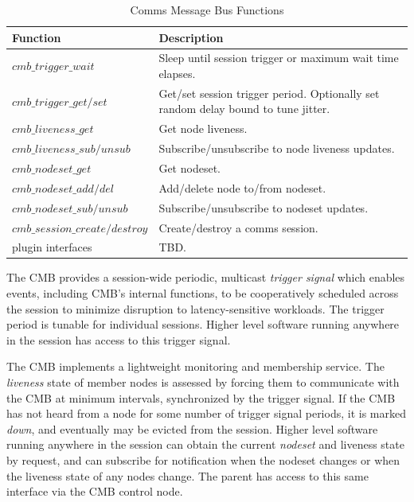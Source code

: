 \begin{table}
  \centering
  \begin{tabular}{| l | p{} |}\hline
  \textbf{Function} & \textbf{Description} \\
  \hline
  $cmb\_trigger\_wait $ &
	Sleep until session trigger or maximum wait time elapses. \\
  $cmb\_trigger\_get/set$ &
	Get/set session trigger period.
	Optionally set random delay bound to tune jitter.\\
  \hline
  $cmb\_liveness\_get$ &
	Get node liveness. \\
  $cmb\_liveness\_sub/unsub$ &
	Subscribe/unsubscribe to node liveness updates. \\
  \hline
  $cmb\_nodeset\_get$ &
	Get nodeset. \\
  $cmb\_nodeset\_add/del$ &
	Add/delete node to/from nodeset. \\
  $cmb\_nodeset\_sub/unsub$ &
	Subscribe/unsubscribe to nodeset updates. \\
  \hline
  $cmb\_session\_create/destroy$ &
	Create/destroy a comms session. \\
  \hline
  plugin interfaces &
	TBD. \\
  \hline
  \end{tabular}
  \caption{Comms Message Bus Functions}
  \label{TabCMBFun}
\end{table}
%

The CMB provides a session-wide periodic, multicast {\em trigger signal}
which enables events, including CMB's internal functions, to be cooperatively
scheduled across the session to minimize disruption to latency-sensitive
workloads.  The trigger period is tunable for individual sessions.
Higher level software running anywhere in the session has access to
this trigger signal.

The CMB implements a lightweight monitoring and membership service.
The {\em liveness} state of member nodes is assessed by forcing
them to communicate with the CMB at minimum intervals,
synchronized by the trigger signal.
If the CMB has not heard from a node for some number
of trigger signal periods, it is marked {\em down}, and eventually may
be evicted from the session.  Higher level software running anywhere in
the session can obtain the current {\em nodeset} and liveness state
by request, and can subscribe for notification when the nodeset changes
or when the liveness state of any nodes change.
The parent has access to this same interface via the CMB control node.

